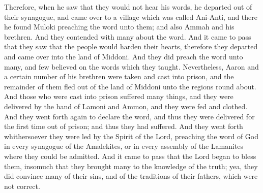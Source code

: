 Therefore, when he saw that they would not hear his words, he departed out of their synagogue, and came over to a village which was called Ani-Anti, and there he found Muloki preaching the word unto them; and also Ammah and his brethren. And they contended with many about the word.
\bverse \iffalse And it came to pass that they saw that the people would harden their hearts, therefore they departed and came over into the land of Middoni. And they did preach the word unto many, and few believed on the words which they taught. \fi
And it came to pass that they saw that the people would harden their hearts, therefore they departed and came over into the land of Middoni. And they did preach the word unto many, and few believed on the words which they taught.
\bverse \iffalse Nevertheless, Aaron and a certain number of his brethren were taken and cast into prison, and the remainder of them fled out of the land of Middoni unto the regions round about. \fi
Nevertheless, Aaron and a certain number of his brethren were taken and cast into prison, and the remainder of them fled out of the land of Middoni unto the regions round about.
\bverse \iffalse And those who were cast into prison suffered many things, and they were delivered by the hand of Lamoni and Ammon, and they were fed and clothed. \fi
And those who were cast into prison suffered many things, and they were delivered by the hand of Lamoni and Ammon, and they were fed and clothed.
\bverse \iffalse And they went forth again to declare the word, and thus they were delivered for the first time out of prison; and thus they had suffered. \fi
And they went forth again to declare the word, and thus they were delivered for the first time out of prison; and thus they had suffered.
\bverse \iffalse And they went forth whithersoever they were led by the Spirit of the Lord, preaching the word of God in every synagogue of the Amalekites, or in every assembly of the Lamanites where they could be admitted. \fi
And they went forth whithersoever they were led by the Spirit of the Lord, preaching the word of God in every synagogue of the Amalekites, or in every assembly of the Lamanites where they could be admitted.
\bverse \iffalse And it came to pass that the Lord began to bless them, insomuch that they brought many to the knowledge of the truth; yea, they did convince many of their sins, and of the traditions of their fathers, which were not correct. \fi
And it came to pass that the Lord began to bless them, insomuch that they brought many to the knowledge of the truth; yea, they did convince many of their sins, and of the traditions of their fathers, which were not correct.
